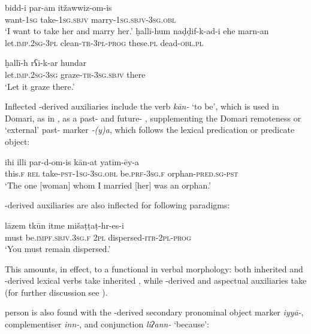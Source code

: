 \documentclass[output=paper]{langsci/langscibook}
\begin{document}
\ex
\gll bidd-i  par-am itžawwiz-om-is\\
     want-\textsc{1sg} take-\textsc{1sg.sbjv} marry-\textsc{1sg.sbjv-3sg.obl}\\
\glt ‘I want to take her and marry her.’
\z
\ex
\ea
\gll ḫallī-hum naḍḍif-k-ad-i ehe marn-an  \\
     let.\textsc{imp.2sg-3pl} clean-\textsc{tr-3pl-prog} these.\textsc{pl} dead-\textsc{obl.pl}\\

\ex
\gll ḫallī-h rʕi-k-ar hundar\\
     let.\textsc{imp.2sg}-\textsc{3sg} graze-\textsc{tr-3sg.sbjv} there\\
\glt ‘Let it graze there.’
\z
\z

Inflected -derived auxiliaries include the  verb \textit{kān-} ‘to be’, which is used in Domari, as in , as a past- and future- , supplementing the Domari remoteness or ‘external’ past- marker \textit{-(y)a}, which follows the lexical predication or predicate object:

\ea \gll ihi illi par-d-om-is kān-at yatīm-ēy-a\\
     this.\textsc{f} \textsc{rel} take-\textsc{pst-1sg-3sg.obl} be.\textsc{prf-3sg.f} orphan-\textsc{pred.sg-pst}\\
\glt ‘The one [woman] whom I married [her] was an orphan.’ \label{ihi}
\z

\noindent {}-derived auxiliaries are also inflected for  following  paradigms:

\ea \gll   lāzem tkūn itme mišaṭṭaṭ-hr-es-i\\
       must be.\textsc{impf.sbjv.3sg.f} \textsc{2pl} dispersed-\textsc{itr-2pl-prog}\\
\glt   ‘You must remain dispersed.’
\z

This amounts, in effect, to a functional  in verbal morphology: both inherited and -derived lexical verbs take inherited  , while -derived  and aspectual auxiliaries take   (for further discussion see \citealt{Matras2015}).

 person  is also found with the -derived secondary pronominal object marker \textit{iyyā-}, complementiser \textit{inn-}, and conjunction \textit{liʔann-} ‘because’:
\end{document}

